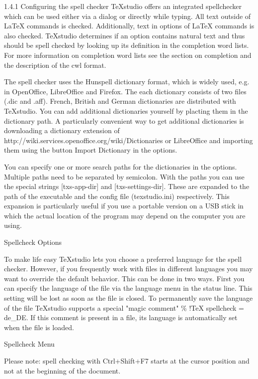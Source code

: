 \documentclass{article}
\begin{document}
	1.4.1 Configuring the spell checker
	TeXstudio offers an integrated spellchecker which can be used either via a dialog or directly while typing. All text outside of LaTeX commands is checked. Additionally, text in options of LaTeX commands is also checked. TeXstudio determines if an option contains natural text and thus should be spell checked by looking up its definition in the completion word lists. For more information on completion word lists see the section on completion and the description of the cwl format.
	
	The spell checker uses the Hunspell dictionary format, which is widely used, e.g. in OpenOffice, LibreOffice and Firefox. The each dictionary consists of two files (.dic and .aff). French, British and German dictionaries are distributed with TeXstudio. You can add additional dictionaries yourself by placting them in the dictionary path. A particularly convenient way to get additional dictionaries is downloading a dictionary extension of http://wiki.services.openoffice.org/wiki/Dictionaries or LibreOffice and importing them using the button Import Dictionary in the options.
	
	You can specify one or more search paths for the dictionaries in the options. Multiple paths need to be separated by semicolon. With the paths you can use the special strings [txs-app-dir] and [txs-settings-dir]. These are expanded to the path of the executable and the config file (texstudio.ini) respectively. This expansion is particularly useful if you use a portable version on a USB stick in which the actual location of the program may depend on the computer you are using.
	
	Spellcheck Options
	
	To make life easy TeXstudio lets you choose a preferred language for the spell checker. However, if you frequently work with files in different languages you may want to override the default behavior. This can be done in two ways. First you can specify the language of the file via the language menu in the status line. This setting will be lost as soon as the file is closed. To permanently save the language of the file TeXstudio supports a special "magic comment" \% !TeX spellcheck = de\_DE. If this comment is present in a file, its language is automatically set when the file is loaded.
	
	Spellcheck Menu
	
	Please note: spell checking with Ctrl+Shift+F7 starts at the cursor position and not at the beginning of the document.
	
\end{document}
